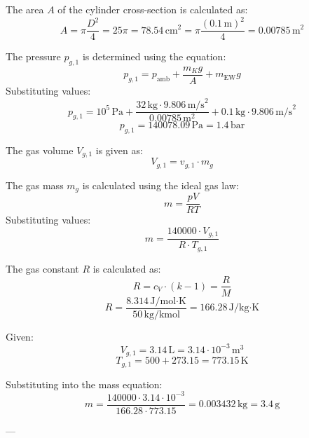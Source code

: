 The area \( A \) of the cylinder cross-section is calculated as:  
\[
A = \pi \frac{D^2}{4} = 25\pi = 78.54 \, \text{cm}^2 = \pi \frac{(0.1 \, \text{m})^2}{4} = 0.00785 \, \text{m}^2
\]  

The pressure \( p_{g,1} \) is determined using the equation:  
\[
p_{g,1} = p_{\text{amb}} + \frac{m_K g}{A} + m_{\text{EW}} g
\]  
Substituting values:  
\[
p_{g,1} = 10^5 \, \text{Pa} + \frac{32 \, \text{kg} \cdot 9.806 \, \text{m/s}^2}{0.00785 \, \text{m}^2} + 0.1 \, \text{kg} \cdot 9.806 \, \text{m/s}^2
\]  
\[
p_{g,1} = 140078.09 \, \text{Pa} = 1.4 \, \text{bar}
\]  

The gas volume \( V_{g,1} \) is given as:  
\[
V_{g,1} = v_{g,1} \cdot m_g
\]  

The gas mass \( m_g \) is calculated using the ideal gas law:  
\[
m = \frac{p V}{R T}
\]  
Substituting values:  
\[
m = \frac{140000 \cdot V_{g,1}}{R \cdot T_{g,1}}
\]  

The gas constant \( R \) is calculated as:  
\[
R = c_V \cdot (k - 1) = \frac{R}{M}
\]  
\[
R = \frac{8.314 \, \text{J/mol·K}}{50 \, \text{kg/kmol}} = 166.28 \, \text{J/kg·K}
\]  

Given:  
\[
V_{g,1} = 3.14 \, \text{L} = 3.14 \cdot 10^{-3} \, \text{m}^3
\]  
\[
T_{g,1} = 500 + 273.15 = 773.15 \, \text{K}
\]  

Substituting into the mass equation:  
\[
m = \frac{140000 \cdot 3.14 \cdot 10^{-3}}{166.28 \cdot 773.15} = 0.003432 \, \text{kg} = 3.4 \, \text{g}
\]  

---